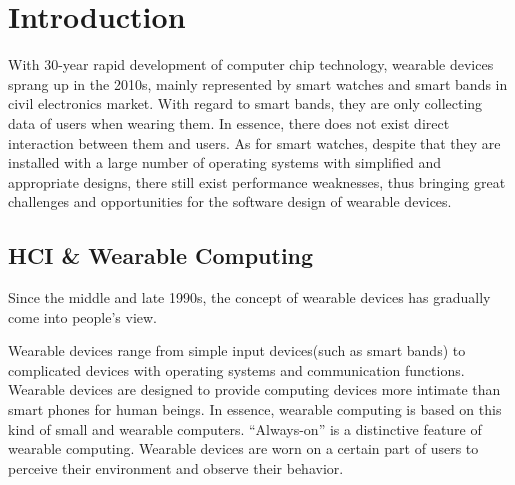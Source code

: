 \chapter{Introduction}

With 30-year rapid development of computer chip technology, wearable devices sprang up in the 2010s, mainly represented by smart watches and smart bands in civil electronics market.
With regard to smart bands, they are only collecting data of users when wearing them. In essence, there does not exist direct interaction between them and users.
As for smart watches, despite that they are installed with a large number of operating systems with simplified and appropriate designs, there still exist performance weaknesses, thus bringing great challenges and opportunities for the software design of wearable devices\cite{DBLP:journals/corr/JiangCZZKZ15}.


\section{HCI \& Wearable Computing}

Since the middle and late 1990s, the concept of wearable devices has gradually come into people’s view.

Wearable devices range from simple input devices(such as smart bands) to complicated devices with operating systems and communication functions.
Wearable devices are designed to provide computing devices more intimate than smart phones for human beings. In essence, wearable computing is based on this kind of small and wearable computers. “Always-on” is a distinctive feature of wearable computing. Wearable devices are worn on a certain part of users to perceive their environment and observe their behavior.

